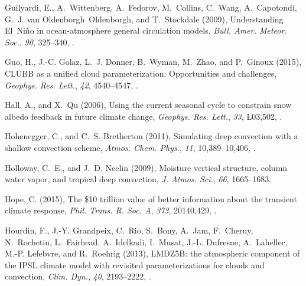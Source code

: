 \documentclass[draft]{agujournal}
\begin{document}
\begin{thebibliography}{196}
Guilyardi, E., A.~Wittenberg, A.~Fedorov, M.~Collins, C.~Wang, A.~Capotondi,
  G.~J. van Oldenborgh~Oldenborgh, and T.~Stockdale (2009), Understanding
  {El~Ni{\~n}o} in ocean-atmosphere general circulation models, \textit{Bull.
  Amer. Meteor. Soc.}, \textit{90}, 325--340, .

Guo, H., J.-C. Golaz, L.~J. Donner, B.~Wyman, M.~Zhao, and P.~Ginoux (2015),
  {CLUBB} as a unified cloud parameterization: Opportunities and challenges,
  \textit{Geophys. Res. Lett.}, \textit{42}, 4540--4547,
  .

Hall, A., and X.~Qu (2006), Using the current seasonal cycle to constrain snow
  albedo feedback in future climate change, \textit{Geophys. Res. Lett.},
  \textit{33}, L03,502, .

Hohenegger, C., and C.~S. Bretherton (2011), Simulating deep convection with a
  shallow convection scheme, \textit{Atmos. Chem. Phys.}, \textit{11},
  10,389--10,406, .

Holloway, C.~E., and J.~D. Neelin (2009), Moisture vertical structure, column
  water vapor, and tropical deep convection, \textit{J. Atmos. Sci.},
  \textit{66}, 1665--1683.

Hope, C. (2015), The \$10 trillion value of better information about the
  transient climate response, \textit{Phil. Trans. R. Soc. A}, \textit{373},
  20140,429, .

Hourdin, F., J.-Y. Grandpeix, C.~Rio, S.~Bony, A.~Jam, F.~Cheruy, N.~Rochetin,
  L.~Fairhead, A.~Idelkadi, I.~Musat, J.-L. Dufresne, A.~Lahellec, M.-P.
  Lefebvre, and R.~Roehrig (2013), {LMDZ5B}: the atmospheric component of the
  {IPSL} climate model with revisited parameterizations for clouds and
  convection, \textit{Clim. Dyn.}, \textit{40}, 2193--2222,
  .


\end{thebibliography}
\end{document}
